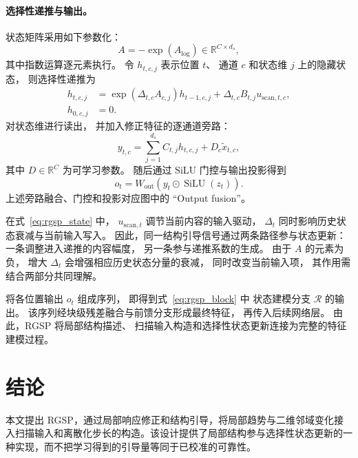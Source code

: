 \documentclass[journal]{IEEEtran}
\begin{document}
\paragraph{选择性递推与输出。}
状态矩阵采用如下参数化：
\begin{equation}
A=-\exp(A_{\log})
\in\mathbb{R}^{C\times d_s},
\label{eq:state_matrix}
\end{equation}
其中指数运算逐元素执行。
令 $h_{t,c,j}$ 表示位置 $t$、
通道 $c$ 和状态维 $j$ 上的隐藏状态，
则选择性递推为
\begin{equation}
\begin{aligned}
h_{t,c,j}&=\exp\left(\Delta_{t,c}A_{c,j}\right)h_{t-1,c,j}
+\Delta_{t,c}B_{t,j}u_{\mathrm{scan},t,c},\\
h_{0,c,j}&=0.
\end{aligned}
\label{eq:rgsp_state}
\end{equation}
对状态维进行读出，
并加入修正特征的逐通道旁路：
\begin{equation}
y_{t,c}
=
\sum_{j=1}^{d_s}C_{t,j}h_{t,c,j}
+
D_c\tilde{x}_{t,c},
\label{eq:ssm_readout}
\end{equation}
其中 $D\in\mathbb{R}^{C}$ 为可学习参数。
随后通过 SiLU 门控与输出投影得到
\begin{equation}
o_t
=
W_{\mathrm{out}}
\left(
y_t\odot\operatorname{SiLU}(z_t)
\right).
\label{eq:rgsp_output}
\end{equation}
上述旁路融合、门控和投影对应图中的
``Output fusion''。

在式~\eqref{eq:rgsp_state} 中，
$u_{\mathrm{scan},t}$ 调节当前内容的输入驱动，
$\Delta_t$ 同时影响历史状态衰减与当前输入写入。
因此，同一结构引导信号通过两条路径参与状态更新：
一条调整进入递推的内容幅度，
另一条参与递推系数的生成。
由于 $A$ 的元素为负，
增大 $\Delta_t$ 会增强相应历史状态分量的衰减，
同时改变当前输入项，
其作用需结合两部分共同理解。

将各位置输出 $o_t$ 组成序列，
即得到式~\eqref{eq:rgsp_block} 中
状态建模分支 $\mathcal{R}$ 的输出。
该序列经块级残差融合与前馈分支形成最终特征，
再传入后续网络层。
由此，RGSP 将局部结构描述、
扫描输入构造和选择性状态更新连接为完整的特征建模过程。

\FloatBarrier

\section{结论}\label{sec:conclusion}
本文提出 RGSP，通过局部响应修正和结构引导，将局部趋势与二维邻域变化接入扫描输入和离散化步长的构造。该设计提供了局部结构参与选择性状态更新的一种实现，而不把学习得到的引导量等同于已校准的可靠性。
\end{document}
